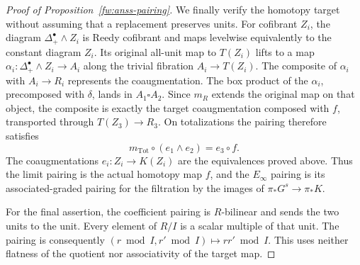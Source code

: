 \begin{proof}[Proof of Proposition~\ref{fw:anss-pairing}]
We finally verify the homotopy target without assuming that a replacement
preserves units.  For cofibrant $Z_i$, the diagram
$\Delta^\bullet_+\wedge Z_i$ is Reedy cofibrant and maps levelwise
equivalently to the constant diagram $Z_i$.  Its original all-unit map
to $T(Z_i)$ lifts to a map
$\alpha_i:\Delta^\bullet_+\wedge Z_i\to A_i$ along the trivial
fibration $A_i\to T(Z_i)$.  The composite of $\alpha_i$ with
$A_i\to R_i$ represents the coaugmentation.  The box product of the
$\alpha_i$, precomposed with $\delta$, lands in $A_1\square A_2$.
Since $m_R$ extends the
original map on that object, the composite is exactly the target
coaugmentation composed with $f$, transported through $T(Z_3)\to R_3$.
On totalizations the pairing therefore satisfies
\[
 m_{\mathrm{Tot}}\circ(e_1\wedge e_2)=e_3\circ f.
\]
The coaugmentations $e_i:Z_i\to K(Z_i)$ are the equivalences proved
above.  Thus the limit pairing is the actual homotopy map $f$, and
the $E_\infty$ pairing is its associated-graded pairing for the
filtration by the images of $\pi_*G^s\to\pi_*K$.

For the final assertion, the coefficient pairing is $R$-bilinear and
sends the two units to the unit.  Every element of $R/I$ is a scalar
multiple of that unit.  The pairing is consequently
$(r\bmod I,r'\bmod I)\mapsto rr'\bmod I$.  This uses neither flatness
of the quotient nor associativity of the target map.
\end{proof}
